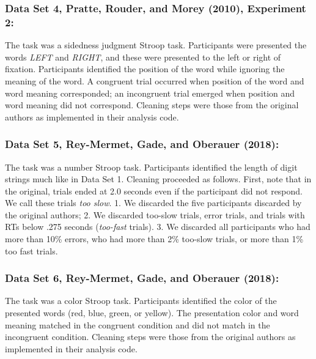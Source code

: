 \documentclass[
  english,
  ,man]{apa6}
\begin{document}
\hypertarget{data-set-4-pratteetal2010-experiment-2}{%
\subsubsection{Data Set 4, Pratte, Rouder, and Morey (2010), Experiment 2:}\label{data-set-4-pratteetal2010-experiment-2}}

The task was a sidedness judgment Stroop task. Participants were presented the words \emph{LEFT} and \emph{RIGHT}, and these were presented to the left or right of fixation. Participants identified the position of the word while ignoring the meaning of the word. A congruent trial occurred when position of the word and word meaning corresponded; an incongruent trial emerged when position and word meaning did not correspond. Cleaning steps were those from the original authors as implemented in their analysis code.

\hypertarget{data-set-5-reymermetetal2018}{%
\subsubsection{Data Set 5, Rey-Mermet, Gade, and Oberauer (2018):}\label{data-set-5-reymermetetal2018}}

The task was a number Stroop task. Participants identified the length of digit strings much like in Data Set 1. Cleaning proceeded as follows. First, note that in the original, trials ended at 2.0 seconds even if the participant did not respond. We call these trials \emph{too slow}. 1. We discarded the five participants discarded by the original authors; 2. We discarded too-slow trials, error trials, and trials with RTs below .275 seconds (\emph{too-fast} trials). 3. We discarded all participants who had more than 10\% errors, who had more than 2\% too-slow trials, or more than 1\% too fast trials.

\hypertarget{data-set-6-reymermetetal2018}{%
\subsubsection{Data Set 6, Rey-Mermet, Gade, and Oberauer (2018):}\label{data-set-6-reymermetetal2018}}

The task was a color Stroop task. Participants identified the color of the presented words (red, blue, green, or yellow). The presentation color and word meaning matched in the congruent condition and did not match in the incongruent condition. Cleaning steps were those from the original authors as implemented in their analysis code.
\end{document}
